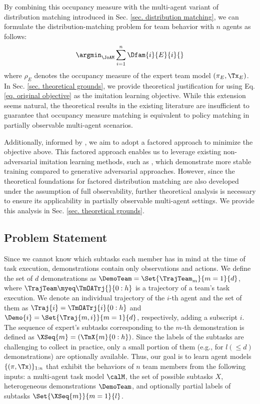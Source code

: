 By combining this occupancy measure with the multi-agent variant of distribution matching introduced in Sec. \ref{sec. distribution matching}, we can formulate the distribution-matching problem for team behavior with $n$ agents as follows:
\begin{align}
    \argmin_{\JoAM} \sum_{i=1}^n \Dfam{i}{E}{i}{}   \label{eq. original objective}
\end{align}
where $\rho_{E}$ denotes the \AMoccu occupancy measure of the expert team model $(\pi_E, \Tx_E)$. In Sec. \ref{sec. theoretical grounds}, we provide theoretical justification for using Eq. \ref{eq. original objective} as the imitation learning objective. While this extension seems natural, the theoretical results in the existing literature are insufficient to guarantee that occupancy measure matching is equivalent to policy matching in partially observable multi-agent scenarios.

Additionally, informed by \idil \cite{seo2024idil}, we aim to adopt a factored approach to minimize the objective above. This factored approach enables us to leverage existing non-adversarial imitation learning methods, such as \iql \cite{garg2021iq}, which demonstrate more stable training compared to generative adversarial approaches. However, since the theoretical foundations for factored distribution matching are also developed under the assumption of full observability, further theoretical analysis is necessary to ensure its applicability in partially observable multi-agent settings. We provide this analysis in Sec. \ref{sec. theoretical grounds}.



\subsection{Problem Statement}
Since we cannot know which subtasks each member has in mind at the time of task execution, demonstrations contain only observations and actions. We define the set of $d$ demonstrations as $\DemoTeam = \Set{\TrajTeam_m}{m=1}{d}$, where $\TrajTeam \myeq \TmOATrj{}{0:h}$ is a trajectory of a team's task execution. 
We denote an individual trajectory of the $i$-th agent and the set of them as $\Traj{i} = \TmOATrj{i}{0:h}$ and $\Demo{i} = \Set{\Traj{m, i}}{m=1}{d}$, respectively, adding a subscript $i$.
The sequence of expert's subtasks corresponding to the $m$-th demonstration is defined as $\XSeq{m} = (\TmX{m}{0:h})$. Since the labels of the subtasks are challenging to collect in practice, only a small portion of them (e.g., for $l (\leq d)$ demonstrations) are optionally available.
Thus, our goal is to learn agent models $\{(\pi, \Tx)\}_{1:n}$ that exhibit the behaviors of $n$ team members from the following inputs: a multi-agent task model $\calM$, the set of possible subtasks $X$, heterogeneous demonstrations $\DemoTeam$, and optionally partial labels of subtasks $\Set{\XSeq{m}}{m=1}{l}$.





